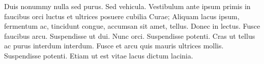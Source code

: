  Duis nonummy nulla sed purus.
Sed vehicula. Vestibulum ante ipsum primis in faucibus orci luctus
et ultrices posuere cubilia Curae; Aliquam lacus ipsum, fermentum
ac, tincidunt congue, accumsan sit amet, tellus. Donec in lectus.
Fusce faucibus arcu. Suspendisse ut dui. Nunc orci. Suspendisse
potenti. Cras ut tellus ac purus interdum interdum. Fusce et arcu
quis mauris ultrices mollis. Suspendisse potenti. Etiam ut est
vitae lacus dictum lacinia.
